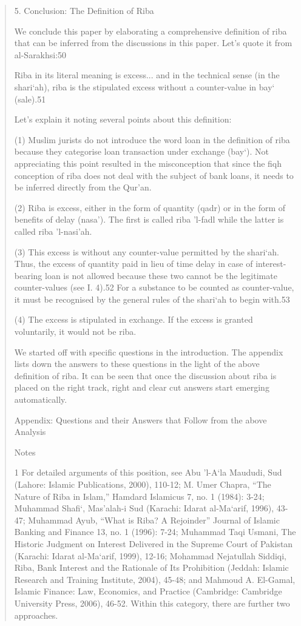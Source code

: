 \begin{quote}
5. Conclusion: The Definition of Riba

We conclude this paper by elaborating a comprehensive definition of riba that can be inferred from the discussions in this paper. Let's quote it from al-Sarakhsi:50
\begin{Synthesis}
Riba in its literal meaning is excess... and in the technical sense (in the shari‘ah), riba is the stipulated excess without a counter-value in bay‘ (sale).51
\end{Synthesis}


Let's explain it noting several points about this definition:

(1) Muslim jurists do not introduce the word loan in the definition of riba because they categorise loan transaction under exchange (bay‘). Not appreciating this point resulted in the misconception that since the fiqh conception of riba does not deal with the subject of bank loans, it needs to be inferred directly from the Qur'an.

(2) Riba is excess, either in the form of quantity (qadr) or in the form of benefits of delay (nasa'). The first is called riba 'l-fadl while the latter is called riba 'l-nasi'ah.

(3) This excess is without any counter-value permitted by the shari‘ah. Thus, the excess of quantity paid in lieu of time delay in case of interest-bearing loan is not allowed because these two cannot be the legitimate counter-values (see I. 4).52 For a substance to be counted as counter-value, it must be recognised by the general rules of the shari‘ah to begin with.53

(4) The excess is stipulated in exchange. If the excess is granted voluntarily, it would not be riba.

We started off with specific questions in the introduction. The appendix lists down the answers to these questions in the light of the above definition of riba. It can be seen that once the discussion about riba is placed on the right track, right and clear cut answers start emerging automatically.

Appendix: Questions and their Answers that Follow from the above Analysis

Notes

1 For detailed arguments of this position, see Abu 'l-A‘la Maududi, Sud (Lahore: Islamic Publications, 2000), 110-12; M. Umer Chapra, “The Nature of Riba in Islam,” Hamdard Islamicus 7, no. 1 (1984): 3-24; Muhammad Shafi‘, Mas'alah-i Sud (Karachi: Idarat al-Ma‘arif, 1996), 43-47; Muhammad Ayub, “What is Riba? A Rejoinder” Journal of Islamic Banking and Finance 13, no. 1 (1996): 7-24; Muhammad Taqi Usmani, The Historic Judgment on Interest Delivered in the Supreme Court of Pakistan (Karachi: Idarat al-Ma‘arif, 1999), 12-16; Mohammad Nejatullah Siddiqi, Riba, Bank Interest and the Rationale of Its Prohibition (Jeddah: Islamic Research and Training Institute, 2004), 45-48; and Mahmoud A. El-Gamal, Islamic Finance: Law, Economics, and Practice (Cambridge: Cambridge University Press, 2006), 46-52. Within this category, there are further two approaches.


\end{quote}
